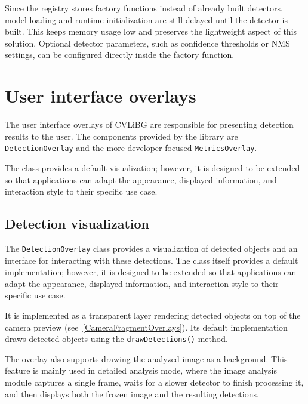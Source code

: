 Since the registry stores factory functions instead of already built detectors, model loading and runtime initialization are still delayed until the detector is built. This keeps memory usage low and preserves the lightweight aspect of this solution. Optional detector parameters, such as confidence thresholds or NMS settings, can be configured directly inside the factory function.



\section{User interface overlays}
\label{DetectionOverlay}
\label{UserInterfaceComponents}

The user interface overlays of CVLiBG are responsible for presenting detection results to the user. The components provided by the library are \texttt{DetectionOverlay} and the more developer-focused \texttt{MetricsOverlay}. 

The class provides a default visualization; however, it is designed to be extended so that applications can adapt the appearance, displayed information, and interaction style to their specific use case.

\subsection{Detection visualization}
\label{DetectionOverlay}

The \texttt{DetectionOverlay} class provides a visualization of detected objects and an interface for interacting with these detections. The class itself provides a default implementation; however, it is designed to be extended so that applications can adapt the appearance, displayed information, and interaction style to their specific use case.

It is implemented as a transparent layer rendering detected objects on top of the camera preview (see~\ref{CameraFragmentOverlays}). Its default implementation draws detected objects using the \texttt{drawDetections()} method.

The overlay also supports drawing the analyzed image as a background. This feature is mainly used in detailed analysis mode, where the image analysis module captures a single frame, waits for a slower detector to finish processing it, and then displays both the frozen image and the resulting detections.

